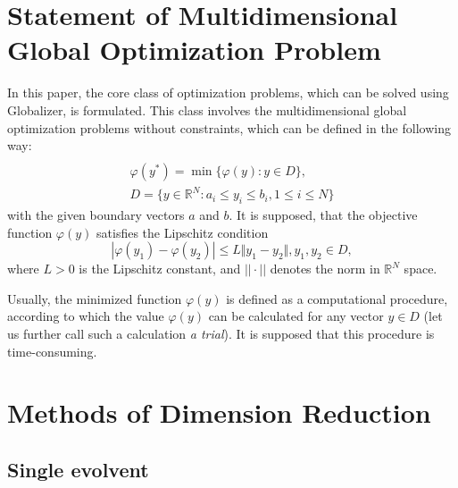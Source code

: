 \documentclass[runningheads]{llncs}
\begin{document}
\section{Statement of Multidimensional Global Optimization Problem}
In this paper, the core class of optimization problems, which can be solved using
Globalizer, is formulated. This class involves the multidimensional global
optimization problems without constraints, which can be defined in the following way:
\begin{equation}
\label{eq:task}
\begin{array}{cr}\\
  \varphi(y^*)=\min\{\varphi(y):y\in D\}, \\
  D=\{y\in \mathbb{R}^N:a_i\leq y_i\leq{b_i}, 1\leq{i}\leq{N}\}
\end{array}
\end{equation}
with the given boundary vectors  $a$ and  $b$. It is supposed, that the objective function
\(\varphi(y)\) satisfies the Lipschitz condition
\begin{equation}
\label{eq:lip}
|\varphi(y_1)-\varphi(y_2)|\leq L\Vert y_1-y_2\Vert,y_1,y_2\in D,
\end{equation}
where \(L>0\) is the Lipschitz constant, and \(||\cdot||\) denotes the norm in \(\mathbb{R}^N\)
space.
\par
Usually, the minimized function \(\varphi(y)\) is defined as a computational procedure,
according to which the value \(\varphi(y)\) can be calculated for any vector \(y\in D\)
(let us further call such a calculation \textit{a trial}). It is supposed that this procedure
is time-consuming.

\section{Methods of Dimension Reduction}
\subsection{Single evolvent}
\end{document}
